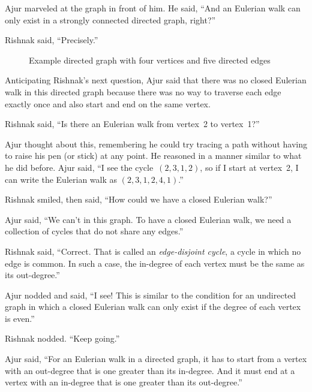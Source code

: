 Ajur marveled at the graph in front of him.  He said, ``And an Eulerian walk can only exist in a strongly connected directed graph, right?''

Rishnak said, ``Precisely.''

\begin{figure}
\begin{center}
\caption{Example directed graph with four vertices and five directed edges}\label{4g5}
\end{center}
\end{figure}


Anticipating Rishnak's next question, Ajur said that there was no closed Eulerian walk in this directed graph because there was no way to traverse each edge exactly once and also start and end on the same vertex.

Rishnak said, ``Is there an Eulerian walk from vertex~2 to vertex~1?''

Ajur thought about this, remembering he could try tracing a path without having to raise his pen (or stick) at any point. He reasoned in a manner similar to what he did before. Ajur said, ``I see the cycle~$(2,3,1,2)$, so if I start at vertex~2, I can write the Eulerian walk as $(2,3,1,2,4,1)$.''

Rishnak smiled, then said, ``How could we have a closed Eulerian walk?''

Ajur said, ``We can't in this graph. To have a closed Eulerian walk, we need a collection of cycles that do not share any edges.''

Rishnak said, ``Correct. That is called an \textit{edge-disjoint cycle}, a cycle in which no edge is common. In such a case, the in-degree of each vertex must be the same as its out-degree.''

Ajur nodded and said, ``I see! This is similar to the condition for an undirected graph in which a closed Eulerian walk can only exist if the degree of each vertex is even.''

Rishnak nodded. ``Keep going.''

Ajur said, ``For an Eulerian walk in a directed graph, it has to start from a vertex with an out-degree that is one greater than its in-degree. And it must end at a vertex with an in-degree that is one greater than its out-degree.''

